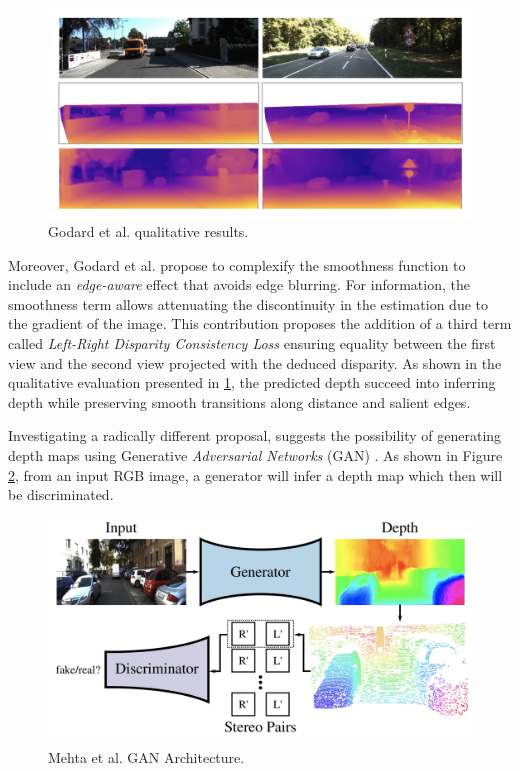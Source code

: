 \begin{figure}[h]
	\centering
	\includegraphics[width=0.8\linewidth]{Figures/SOA/illugod1}
	\caption[Godard et al. qualitative results.]{Godard et al. qualitative results.}
	\label{illugod1}
\end{figure}


Moreover, Godard et al. propose to complexify the smoothness function to include an \emph{edge-aware} effect that avoids edge blurring. For information, the smoothness term allows attenuating the discontinuity in the estimation due to the gradient of the image. This contribution proposes the addition of a third term called \emph{Left-Right Disparity Consistency Loss} ensuring equality between the first view and the second view projected with the deduced disparity. As shown in the qualitative evaluation presented in \ref{illugod1}, the predicted depth succeed into inferring depth while preserving smooth transitions along distance and salient edges.


Investigating a radically different proposal, \cite{mehta2018structured} suggests the possibility of generating depth maps using Generative \emph{Adversarial Networks} (GAN) \cite{goodfellow2014generative}. As shown in Figure \ref{illumehta}, from an input RGB image, a generator will infer a depth map which then will be discriminated.

\begin{figure}[h]
	\centering
	\includegraphics[width=0.8\linewidth]{Figures/SOA/illumehta}
	\caption[Mehta et al. GAN Architecture.]{Mehta et al. GAN Architecture.}
	\label{illumehta}
\end{figure}

